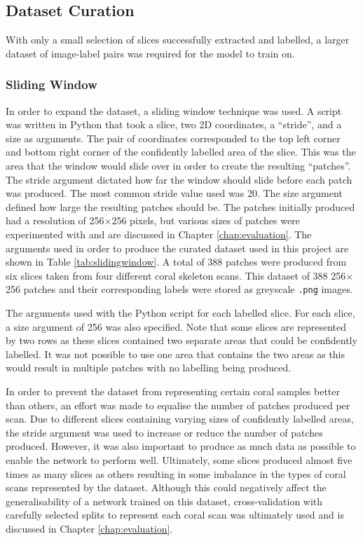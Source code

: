 \subsection{Dataset Curation}
\label{sec:datasetcuration}

With only a small selection of slices successfully extracted and labelled, a larger dataset of image-label pairs was required for the model to train on.

\subsubsection{Sliding Window}

In order to expand the dataset, a sliding window technique was used. A script was written in Python that took a slice, two 2D coordinates, a ``stride'', and a size as arguments. The pair of coordinates corresponded to the top left corner and bottom right corner of the confidently labelled area of the slice. This was the area that the window would slide over in order to create the resulting ``patches''. The stride argument dictated how far the window should slide before each patch was produced. The most common stride value used was 20. The size argument defined how large the resulting patches should be. The patches initially produced had a resolution of 256$\times$256 pixels, but various sizes of patches were experimented with and are discussed in Chapter \ref{chap:evaluation}. The arguments used in order to produce the curated dataset used in this project are shown in Table \ref{tab:slidingwindow}. A total of 388 patches were produced from six slices taken from four different coral skeleton scans. This dataset of 388 256$\times$256 patches and their corresponding labels were stored as greyscale \texttt{.png} images.

\begin{table}[t]
\centering
\caption{The arguments used with the Python script for each labelled slice. For each slice, a size argument of 256 was also specified. Note that some slices are represented by two rows as these slices contained two separate areas that could be confidently labelled. It was not possible to use one area that contains the two areas as this would result in multiple patches with no labelling being produced.}

\label{tab:slidingwindow}
\end{table}

In order to prevent the dataset from representing certain coral samples better than others, an effort was made to equalise the number of patches produced per scan. Due to different slices containing varying sizes of confidently labelled areas, the stride argument was used to increase or reduce the number of patches produced. However, it was also important to produce as much data as possible to enable the network to perform well. Ultimately, some slices produced almost five times as many slices as others resulting in some imbalance in the types of coral scans represented by the dataset. Although this could negatively affect the generalisability of a network trained on this dataset, cross-validation with carefully selected splits to represent each coral scan was ultimately used and is discussed in Chapter \ref{chap:evaluation}.

